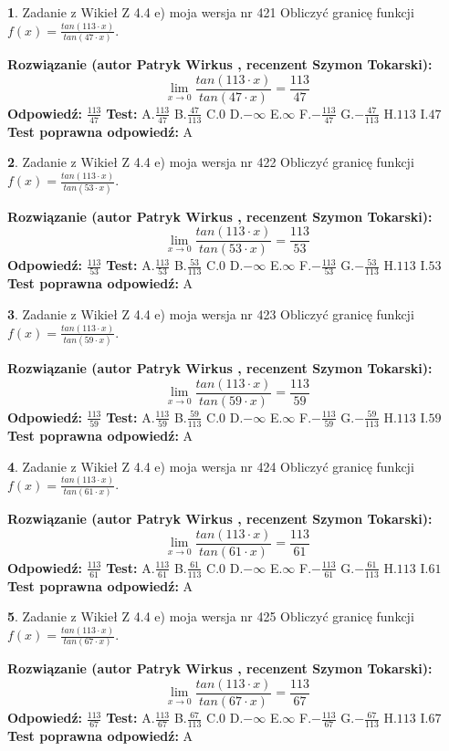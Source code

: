 \documentclass[12pt, a4paper]{article}
\theoremstyle{definition} %
\newtheorem{zad}{}
\newcommand{\zadStart}[1]{\begin{zad}#1\newline}
\newcommand{\zadStop}{\end{zad}}
\newcommand{\rozwStart}[2]{\noindent \textbf{Rozwiązanie (autor #1 , recenzent #2): }\newline}
\newcommand{\rozwStop}{\newline}
\newcommand{\odpStart}{\noindent \textbf{Odpowiedź:}\newline}
\newcommand{\odpStop}{\newline}
\newcommand{\testStart}{\noindent \textbf{Test:}\newline}
\newcommand{\testStop}{\newline}
\newcommand{\kluczStart}{\noindent \textbf{Test poprawna odpowiedź:}\newline}
\newcommand{\kluczStop}{\newline}
\begin{document}
\zadStart{Zadanie z Wikieł Z 4.4 e) moja wersja nr 421}
Obliczyć granicę funkcji $f(x)=\frac{tan(113\cdot x)}{tan(47\cdot x)}$.
\zadStop
\rozwStart{Patryk Wirkus}{Szymon Tokarski}
$$\lim\limits_{x\to 0}\frac{tan(113\cdot x)}{tan(47\cdot x)}=
\frac{113}{47}$$
\rozwStop
\odpStart
$\frac{113}{47}$
\odpStop
\testStart
A.$\frac{113}{47}$
B.$\frac{47}{113}$
C.$0$
D.$-\infty$
E.$\infty$
F.$-\frac{113}{47}$
G.$-\frac{47}{113}$
H.$113$
I.$47$
\testStop
\kluczStart
A
\kluczStop



\zadStart{Zadanie z Wikieł Z 4.4 e) moja wersja nr 422}
Obliczyć granicę funkcji $f(x)=\frac{tan(113\cdot x)}{tan(53\cdot x)}$.
\zadStop
\rozwStart{Patryk Wirkus}{Szymon Tokarski}
$$\lim\limits_{x\to 0}\frac{tan(113\cdot x)}{tan(53\cdot x)}=
\frac{113}{53}$$
\rozwStop
\odpStart
$\frac{113}{53}$
\odpStop
\testStart
A.$\frac{113}{53}$
B.$\frac{53}{113}$
C.$0$
D.$-\infty$
E.$\infty$
F.$-\frac{113}{53}$
G.$-\frac{53}{113}$
H.$113$
I.$53$
\testStop
\kluczStart
A
\kluczStop



\zadStart{Zadanie z Wikieł Z 4.4 e) moja wersja nr 423}
Obliczyć granicę funkcji $f(x)=\frac{tan(113\cdot x)}{tan(59\cdot x)}$.
\zadStop
\rozwStart{Patryk Wirkus}{Szymon Tokarski}
$$\lim\limits_{x\to 0}\frac{tan(113\cdot x)}{tan(59\cdot x)}=
\frac{113}{59}$$
\rozwStop
\odpStart
$\frac{113}{59}$
\odpStop
\testStart
A.$\frac{113}{59}$
B.$\frac{59}{113}$
C.$0$
D.$-\infty$
E.$\infty$
F.$-\frac{113}{59}$
G.$-\frac{59}{113}$
H.$113$
I.$59$
\testStop
\kluczStart
A
\kluczStop



\zadStart{Zadanie z Wikieł Z 4.4 e) moja wersja nr 424}
Obliczyć granicę funkcji $f(x)=\frac{tan(113\cdot x)}{tan(61\cdot x)}$.
\zadStop
\rozwStart{Patryk Wirkus}{Szymon Tokarski}
$$\lim\limits_{x\to 0}\frac{tan(113\cdot x)}{tan(61\cdot x)}=
\frac{113}{61}$$
\rozwStop
\odpStart
$\frac{113}{61}$
\odpStop
\testStart
A.$\frac{113}{61}$
B.$\frac{61}{113}$
C.$0$
D.$-\infty$
E.$\infty$
F.$-\frac{113}{61}$
G.$-\frac{61}{113}$
H.$113$
I.$61$
\testStop
\kluczStart
A
\kluczStop



\zadStart{Zadanie z Wikieł Z 4.4 e) moja wersja nr 425}
Obliczyć granicę funkcji $f(x)=\frac{tan(113\cdot x)}{tan(67\cdot x)}$.
\zadStop
\rozwStart{Patryk Wirkus}{Szymon Tokarski}
$$\lim\limits_{x\to 0}\frac{tan(113\cdot x)}{tan(67\cdot x)}=
\frac{113}{67}$$
\rozwStop
\odpStart
$\frac{113}{67}$
\odpStop
\testStart
A.$\frac{113}{67}$
B.$\frac{67}{113}$
C.$0$
D.$-\infty$
E.$\infty$
F.$-\frac{113}{67}$
G.$-\frac{67}{113}$
H.$113$
I.$67$
\testStop
\kluczStart
A
\kluczStop
\end{document}
